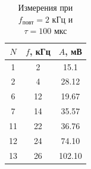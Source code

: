 \documentclass[12pt]{article}
\begin{document}
\begin{enumerate}
\begin{table}[h!]
			\centering
			\begin{tabular}{|c|c|c|}
			\hline
				$N$ & $f$, кГц & $A$, мВ \\
			\hline
				1 & 2 & 15.1 \\
			\hline
				2 & 4 & 28.12 \\
			\hline
				6 & 12 & 19.67 \\
			\hline
				7 & 14 & 35.57 \\
			\hline
				11 & 22 & 36.76 \\
			\hline
				12 & 24 &  74.10 \\
			\hline
				13 & 26 & 102.10 \\
			\hline			
			\end{tabular}
			\caption*{Измерения при $f_\text{повт} = 2$ кГц и $\tau = 100$ мкс}
		\end{table}
\end{enumerate}
\end{document}

